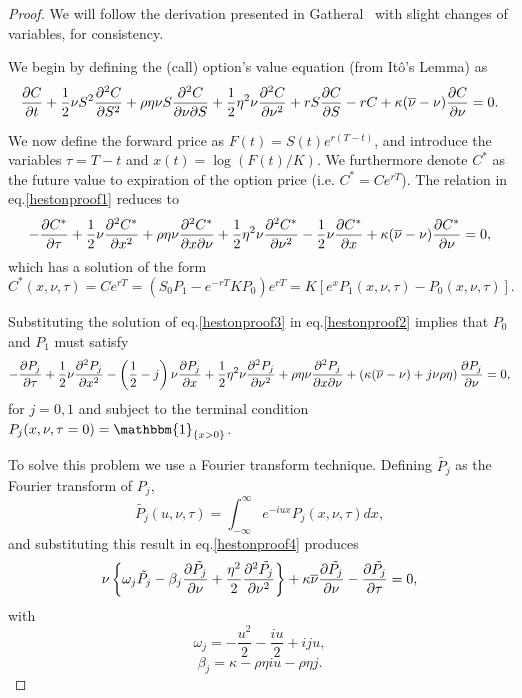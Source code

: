 \begin{proof}
We will follow the derivation presented in Gatheral~\citep{gatheral} with slight changes of variables, for consistency.

We begin by defining the (call) option's value equation (from Itô's Lemma) as
\begin{equation}\label{hestonproof1}
\pdv{C}{t}+\frac{1}{2}\nu S^2\pdv[2]{C}{S}+\rho\eta\nu S\pdv{C}{\nu}{S}+\frac{1}{2}\eta^2\nu\pdv[2]{C}{\nu}+rS\pdv{C}{S}-rC+\kappa(\overline{\nu}-\nu)\pdv{C}{\nu}=0.
\end{equation}

We now define the forward price as $F(t)=S(t)e^{r(T-t)}$, and introduce the variables $\tau=T-t$ and $x(t)=\log\left(F(t)/K\right)$. We furthermore denote $C^*$ as the future value to expiration of the option price (i.e. $C^*=Ce^{rT}$). The relation in eq.\eqref{hestonproof1} reduces to
\begin{equation}\label{hestonproof2}
-\pdv{C^*}{\tau}+\frac{1}{2}\nu\pdv[2]{C^*}{x}+\rho\eta\nu\pdv{C^*}{x}{\nu}+\frac{1}{2}\eta^2\nu\pdv[2]{C^*}{\nu}-\frac{1}{2}\nu\pdv{C^*}{x}+\kappa(\overline{\nu}-\nu)\pdv{C^*}{\nu}=0,
\end{equation}
\noindent which has a solution of the form ~\citep{duffie}
\begin{equation}\label{hestonproof3}
C^*(x,\nu,\tau)=Ce^{rT}=\left(S_0P_1-e^{-rT}KP_0\right)e^{rT}=K\left[e^xP_1(x,\nu,\tau)-P_0(x,\nu,\tau)\right].
\end{equation}


Substituting the solution of eq.\eqref{hestonproof3} in eq.\eqref{hestonproof2} implies that $P_0$ and $P_1$ must satisfy
\begin{equation}\label{hestonproof4}
-\pdv{P_j}{\tau}+\frac{1}{2}\nu\pdv[2]{P_j}{x}-\left(\frac{1}{2}-j\right)\nu\pdv{P_j}{x}+\frac{1}{2}\eta^2\nu\pdv[2]{P_j}{\nu}+\rho\eta\nu\pdv{P_j}{x}{\nu}+\left(\kappa(\overline{\nu}-\nu)+j\nu\rho\eta\right)\pdv{P_j}{\nu}=0,
\end{equation}
\noindent for $j=0,1$ and subject to the terminal condition $P_j(x,\nu,\tau=0)=\mathbbm{1}_{\left\{x>0\right\}}$.


To solve this problem we use a Fourier transform technique. Defining $\tilde{P_j}$ as the Fourier transform of $P_j$,
\begin{equation}
\tilde{P_j}(u,\nu,\tau)=\int_{-\infty}^{\infty}e^{-iux}P_j(x,\nu,\tau)dx,
\end{equation}
\noindent and substituting this result in eq.\eqref{hestonproof4} produces
\begin{equation}\label{hestonproof5}
\nu\left\{\omega_j\tilde{P_j}-\beta_j\pdv{\tilde{P_j}}{\nu}+\frac{\eta^2}{2}\pdv[2]{\tilde{P_j}}{\nu}\right\}+\kappa\overline{\nu}\pdv{\tilde{P_j}}{\nu}-\pdv{\tilde{P_j}}{\tau}=0,
\end{equation}
\noindent with
\begin{equation}
\omega_j=-\frac{u^2}{2}-\frac{iu}{2}+iju,
\end{equation}
\begin{equation}
\beta_j=\kappa-\rho\eta iu-\rho\eta j.
\end{equation}



\end{proof}
